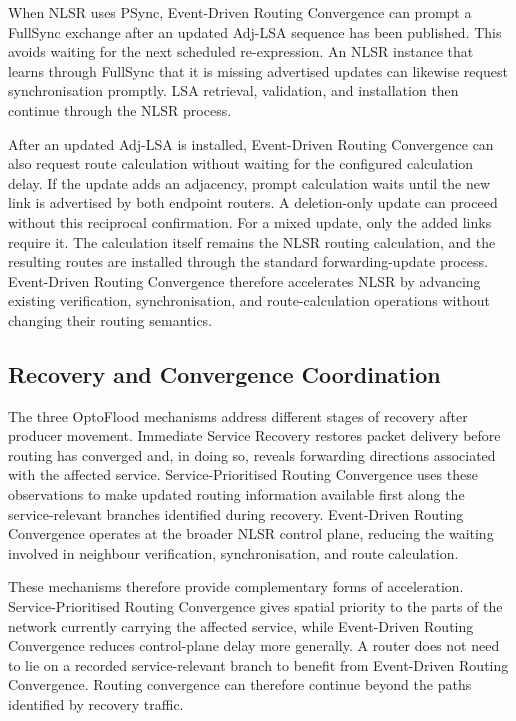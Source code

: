 \documentclass[10pt,conference]{IEEEtran}
\begin{document}
When NLSR uses PSync, Event-Driven Routing Convergence can prompt a FullSync exchange after an updated Adj-LSA sequence has been published. This avoids waiting for the next scheduled re-expression. An NLSR instance that learns through FullSync that it is missing advertised updates can likewise request synchronisation promptly. LSA retrieval, validation, and installation then continue through the NLSR process.

After an updated Adj-LSA is installed, Event-Driven Routing Convergence can also request route calculation without waiting for the configured calculation delay. If the update adds an adjacency, prompt calculation waits until the new link is advertised by both endpoint routers. A deletion-only update can proceed without this reciprocal confirmation. For a mixed update, only the added links require it. The calculation itself remains the NLSR routing calculation, and the resulting routes are installed through the standard forwarding-update process. Event-Driven Routing Convergence therefore accelerates NLSR by advancing existing verification, synchronisation, and route-calculation operations without changing their routing semantics.

\subsection{Recovery and Convergence Coordination}
\label{sec:design:coordination}

The three OptoFlood mechanisms address different stages of recovery after producer movement. Immediate Service Recovery restores packet delivery before routing has converged and, in doing so, reveals forwarding directions associated with the affected service. Service-Prioritised Routing Convergence uses these observations to make updated routing information available first along the service-relevant branches identified during recovery. Event-Driven Routing Convergence operates at the broader NLSR control plane, reducing the waiting involved in neighbour verification, synchronisation, and route calculation.

These mechanisms therefore provide complementary forms of acceleration. Service-Prioritised Routing Convergence gives spatial priority to the parts of the network currently carrying the affected service, while Event-Driven Routing Convergence reduces control-plane delay more generally. A router does not need to lie on a recorded service-relevant branch to benefit from Event-Driven Routing Convergence. Routing convergence can therefore continue beyond the paths identified by recovery traffic.
\end{document}
